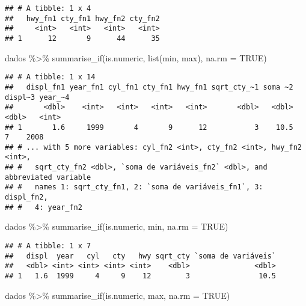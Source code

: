 \documentclass[
]{book}
\newenvironment{Shaded}{\begin{snugshade}}{\end{snugshade}}
\newcommand{\AttributeTok}[1]{\textcolor[rgb]{0.77,0.63,0.00}{#1}}
\newcommand{\ConstantTok}[1]{\textcolor[rgb]{0.00,0.00,0.00}{#1}}
\newcommand{\FunctionTok}[1]{\textcolor[rgb]{0.00,0.00,0.00}{#1}}
\newcommand{\NormalTok}[1]{#1}
\newcommand{\SpecialCharTok}[1]{\textcolor[rgb]{0.00,0.00,0.00}{#1}}
\begin{document}
\begin{verbatim}
## # A tibble: 1 x 4
##   hwy_fn1 cty_fn1 hwy_fn2 cty_fn2
##     <int>   <int>   <int>   <int>
## 1      12       9      44      35
\end{verbatim}

\begin{Shaded}
\begin{Highlighting}[]
\NormalTok{dados }\SpecialCharTok{\%\textgreater{}\%}
  \FunctionTok{summarise\_if}\NormalTok{(is.numeric, }\FunctionTok{list}\NormalTok{(min, max), }\AttributeTok{na.rm =} \ConstantTok{TRUE}\NormalTok{) }
\end{Highlighting}
\end{Shaded}

\begin{verbatim}
## # A tibble: 1 x 14
##   displ_fn1 year_fn1 cyl_fn1 cty_fn1 hwy_fn1 sqrt_cty_~1 soma ~2 displ~3 year_~4
##       <dbl>    <int>   <int>   <int>   <int>       <dbl>   <dbl>   <dbl>   <int>
## 1       1.6     1999       4       9      12           3    10.5       7    2008
## # ... with 5 more variables: cyl_fn2 <int>, cty_fn2 <int>, hwy_fn2 <int>,
## #   sqrt_cty_fn2 <dbl>, `soma de variáveis_fn2` <dbl>, and abbreviated variable
## #   names 1: sqrt_cty_fn1, 2: `soma de variáveis_fn1`, 3: displ_fn2,
## #   4: year_fn2
\end{verbatim}

\begin{Shaded}
\begin{Highlighting}[]
\NormalTok{dados }\SpecialCharTok{\%\textgreater{}\%}
  \FunctionTok{summarise\_if}\NormalTok{(is.numeric, min, }\AttributeTok{na.rm =} \ConstantTok{TRUE}\NormalTok{) }
\end{Highlighting}
\end{Shaded}

\begin{verbatim}
## # A tibble: 1 x 7
##   displ  year   cyl   cty   hwy sqrt_cty `soma de variáveis`
##   <dbl> <int> <int> <int> <int>    <dbl>               <dbl>
## 1   1.6  1999     4     9    12        3                10.5
\end{verbatim}

\begin{Shaded}
\begin{Highlighting}[]
\NormalTok{dados }\SpecialCharTok{\%\textgreater{}\%}
  \FunctionTok{summarise\_if}\NormalTok{(is.numeric, max, }\AttributeTok{na.rm =} \ConstantTok{TRUE}\NormalTok{) }
\end{Highlighting}
\end{Shaded}
\end{document}

